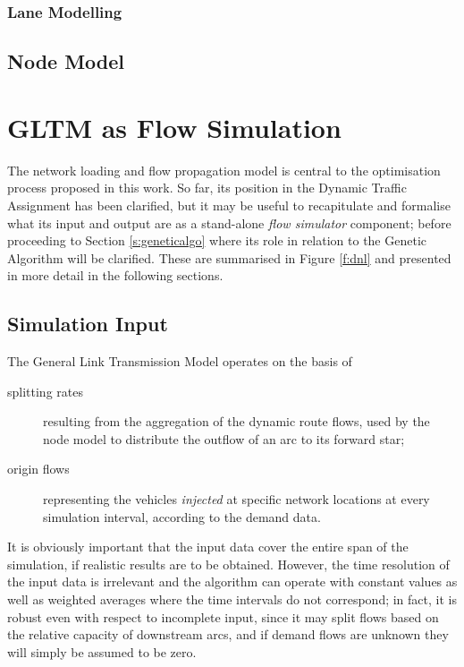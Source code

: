 




\subsubsection{Lane Modelling}

\subsection{Node Model}

\section{GLTM as Flow Simulation}
The network loading and flow propagation model is central to the optimisation process proposed in this work.
So far, its position in the Dynamic Traffic Assignment has been clarified, but it may be useful to recapitulate and formalise what its input and output are as a stand-alone \emph{flow simulator} component; before proceeding to Section \ref{s:geneticalgo} where its role in relation to the Genetic Algorithm will be clarified. These are summarised in Figure \ref{f:dnl} and presented in more detail in the following sections.


\subsection{Simulation Input}
The General Link Transmission Model operates on the basis of
\begin{description}
\item[splitting rates] resulting from the aggregation of the dynamic route flows, used by the node model to distribute the outflow of an arc to its forward star;
\item[origin flows] representing the vehicles \emph{injected} at specific network locations at every simulation interval, according to the demand data.
\end{description}

It is obviously important that the input data cover the entire span of the simulation, if realistic results are to be obtained.
However, the time resolution of the input data is irrelevant and the algorithm can operate with constant values as well as weighted averages where the time intervals do not correspond; in fact, it is robust even with respect to incomplete input, since it may split flows based on the relative capacity of downstream arcs, and if demand flows are unknown they will simply be assumed to be zero.


